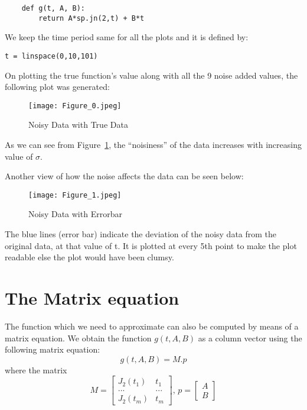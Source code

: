 \documentclass[11pt, a4paper]{article}
\begin{document}
\begin{verbatim}
    def g(t, A, B):
        return A*sp.jn(2,t) + B*t
\end{verbatim}

We keep the time period same for all the plots and it is defined by:

\texttt{t = linspace(0,10,101)}
\newline

On plotting the true function’s value along with all the 9 noise added values, the following plot was generated:

  \begin{figure}[!tbh]
   	\centering
   	\texttt{[image: Figure\_0.jpeg]}  
   	\caption{Noisy Data with True Data}
   	\label{fig:fig1}
   \end{figure} 

As we can see from Figure~\ref{fig:fig1}, the “noisiness” of the data increases with increasing value of $\sigma$. 

Another view of how the noise affects the data can be seen below: 

  \begin{figure}[!tbh]
   	\centering
   	\texttt{[image: Figure\_1.jpeg]}  
   	\caption{Noisy Data with Errorbar}
   	\label{fig:fig2}
   \end{figure} 
   
The blue lines (error bar) indicate the deviation of the noisy data from the original data, at that value of t. It is plotted at every 5th point to make the plot readable else the plot would have been clumsy.

\section{The Matrix equation}
The function which we need to approximate can also be computed by means of a matrix equation. We obtain the function $g(t,A,B)$ as a column vector using the following matrix equation:
\begin{equation}\label{eq:3}
    g(t,A,B) = M.p
\end{equation}
where the matrix
\begin{equation}
M=\left[\begin{matrix}
J_2(t_1)&t_1\\
...&...\\
J_2(t_m)&t_m
\end{matrix}\right]\text{, }
p=\left[\begin{matrix}
A\\B
\end{matrix}\right]
\end{equation}
\end{document}
